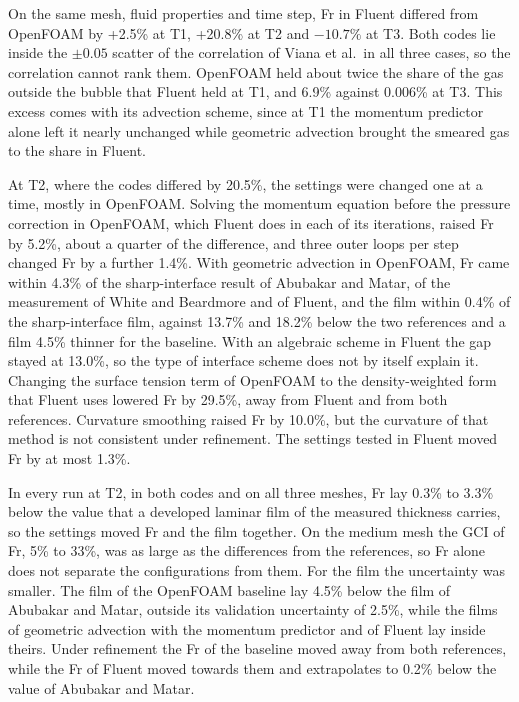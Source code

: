 \documentclass[11pt,a4paper]{article}
\begin{document}
On the same mesh, fluid properties and time step, Fr in Fluent differed from OpenFOAM by +2.5\% at T1, +20.8\% at T2 and $-10.7\%$ at T3. Both codes lie inside the $\pm0.05$ scatter of the correlation of Viana et al.\ in all three cases, so the correlation cannot rank them. OpenFOAM held about twice the share of the gas outside the bubble that Fluent held at T1, and 6.9\% against 0.006\% at T3. This excess comes with its advection scheme, since at T1 the momentum predictor alone left it nearly unchanged while geometric advection brought the smeared gas to the share in Fluent.

At T2, where the codes differed by 20.5\%, the settings were changed one at a time, mostly in OpenFOAM. Solving the momentum equation before the pressure correction in OpenFOAM, which Fluent does in each of its iterations, raised Fr by 5.2\%, about a quarter of the difference, and three outer loops per step changed Fr by a further 1.4\%. With geometric advection in OpenFOAM, Fr came within 4.3\% of the sharp-interface result of Abubakar and Matar, of the measurement of White and Beardmore and of Fluent, and the film within 0.4\% of the sharp-interface film, against 13.7\% and 18.2\% below the two references and a film 4.5\% thinner for the baseline. With an algebraic scheme in Fluent the gap stayed at 13.0\%, so the type of interface scheme does not by itself explain it. Changing the surface tension term of OpenFOAM to the density-weighted form that Fluent uses lowered Fr by 29.5\%, away from Fluent and from both references. Curvature smoothing raised Fr by 10.0\%, but the curvature of that method is not consistent under refinement. The settings tested in Fluent moved Fr by at most 1.3\%.

In every run at T2, in both codes and on all three meshes, Fr lay 0.3\% to 3.3\% below the value that a developed laminar film of the measured thickness carries, so the settings moved Fr and the film together. On the medium mesh the GCI of Fr, 5\% to 33\%, was as large as the differences from the references, so Fr alone does not separate the configurations from them. For the film the uncertainty was smaller. The film of the OpenFOAM baseline lay 4.5\% below the film of Abubakar and Matar, outside its validation uncertainty of 2.5\%, while the films of geometric advection with the momentum predictor and of Fluent lay inside theirs. Under refinement the Fr of the baseline moved away from both references, while the Fr of Fluent moved towards them and extrapolates to 0.2\% below the value of Abubakar and Matar.
\end{document}
